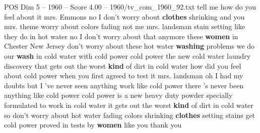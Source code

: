 \begin{textsample}{POS Dim 5 – 1960 – Score 4.00 – 1960/tv\_com\_1960\_92.txt}  \label{ex:f5_pos_081}
tell me how do you feel about it mrs.
Emmons no I don't worry about \textbf{clothes} shrinking and you mrs. theme worry about colors fading not me mrs. landsman stain setting like they do in hot water no I don't worry about that anymore these \textbf{women} in Chester New Jersey don't worry about these hot water \textbf{washing} problems we do our \textbf{wash} in cold water with cold power cold power the new cold water laundry discovery that gets out the worst \textbf{kind} of dirt in cold water how did you feel about cold power when you first agreed to test it mrs. landsman oh I had my doubts but I 've never seen anything work like cold power there 's never been anything like cold power cold power is a new heavy duty powder specially formulated to work in cold water it gets out the worst \textbf{kind} of dirt in cold water so don't worry about hot water fading colors shrinking \textbf{clothes} setting stains get cold power proved in tests by \textbf{women} like you thank you

\end{textsample}
